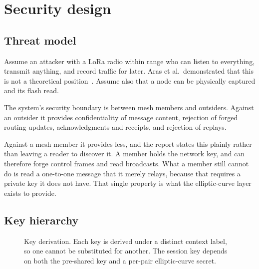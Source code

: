 \documentclass[12pt,a4paper,oneside]{report}
\begin{document}
\section{Security design}

\subsection{Threat model}

Assume an attacker with a LoRa radio within range who can listen to everything,
transmit anything, and record traffic for later. Aras et al.\ demonstrated that
this is not a theoretical position~\cite{aras2017exploring}. Assume also that a
node can be physically captured and its flash read.

The system's security boundary is between mesh members and outsiders. Against an
outsider it provides confidentiality of message content, rejection of forged
routing updates, acknowledgments and receipts, and rejection of replays.

Against a mesh member it provides less, and the report states this plainly rather
than leaving a reader to discover it. A member holds the network key, and can
therefore forge control frames and read broadcasts. What a member still cannot do
is read a one-to-one message that it merely relays, because that requires a
private key it does not have. That single property is what the elliptic-curve
layer exists to provide.

\subsection{Key hierarchy}

\begin{figure}[htbp]
\centering
{}
\caption{Key derivation. Each key is derived under a distinct context label, so
one cannot be substituted for another. The session key depends on both the
pre-shared key and a per-pair elliptic-curve secret.}
\label{fig:keys}
\end{figure}
\end{document}
